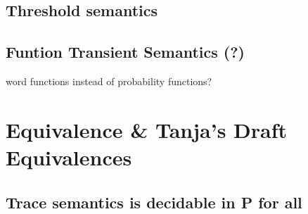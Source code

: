             \begin{definition}
            \end{definition}
                       
        
        \subsection{Threshold semantics}
            
        
        \subsection{Funtion Transient Semantics (?)}
        word functions instead of probability functions?
           
        
        
        
        
        
        
    \section{Equivalence \& Tanja's Draft Equivalences}
            \begin{definition}
            
        \end{definition}
        
        \subsection{Trace semantics is decidable in P for all}
                \begin{definition}
                 
                \end{definition}

